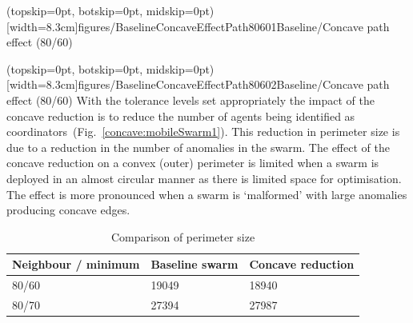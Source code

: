 \documentclass{ieeeaccess}
\begin{document}
\Figure[t!](topskip=0pt, botskip=0pt, midskip=0pt)[width=8.3cm]{figures/BaselineConcaveEffectPath80601}{Baseline/Concave path effect (80/60)\label{concave:BaselineConcaveEffectPath80601}}

\Figure[t!](topskip=0pt, botskip=0pt, midskip=0pt)[width=8.3cm]{figures/BaselineConcaveEffectPath80602}{Baseline/Concave path effect (80/60)\label{concave:BaselineConcaveEffectPath80602}}
With the tolerance levels set appropriately the impact of the concave reduction is to reduce the number of agents being identified as coordinators~(Fig.~\ref{concave:mobileSwarm1}). This reduction in perimeter size is due to a reduction in the number of anomalies in the swarm. The effect of the concave reduction on a convex (outer) perimeter is limited when a swarm is deployed in an almost circular manner as there is limited space for optimisation. The effect is more pronounced when a swarm is `malformed' with large anomalies producing concave edges.

\begin{table}
\caption{Comparison of perimeter size} 
\label{tab:BaselineConcaveComparison}
\begin{center}
\begin{tabular}{| p{2.3cm} | p{2cm} | p{2cm} |}
\hline
\bf Neighbour / minimum & \bf Baseline \bf swarm & \bf Concave \bf reduction \\ \hline
80/60 & 19049 & 18940 \\  \hline
80/70 & 27394 & 27987 \\  \hline
\end{tabular}
\end{center}
\end{table}
\end{document}
